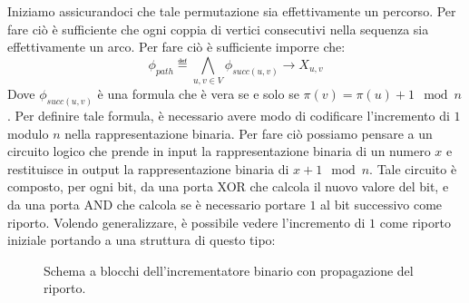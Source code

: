 Iniziamo assicurandoci che tale permutazione sia effettivamente un percorso. Per fare ciò è sufficiente che ogni coppia di vertici consecutivi nella sequenza sia effettivamente un arco. Per fare ciò è sufficiente imporre che:
\[\phi_{path} \eqdef \bigwedge_{u,v\in V} \phi_{succ(u,v)} \to X_{u,v}\]
Dove \(\phi_{succ(u,v)}\) è una formula che è vera se e solo se \(\pi(v) = \pi(u)+1 \mod n\). Per definire tale formula, è necessario avere modo di codificare l'incremento di \(1\) modulo \(n\) nella rappresentazione binaria. Per fare ciò possiamo pensare a un circuito logico che prende in input la rappresentazione binaria di un numero \(x\) e restituisce in output la rappresentazione binaria di \(x+1 \mod n\). Tale circuito è composto, per ogni bit, da una porta XOR che calcola il nuovo valore del bit, e da una porta AND che calcola se è necessario portare \(1\) al bit successivo come riporto. Volendo generalizzare, è possibile vedere l'incremento di \(1\) come riporto iniziale portando a una struttura di questo tipo:

\begin{figure}[h!]
	\centering
	\caption{Schema a blocchi dell'incrementatore binario con propagazione del riporto.}\label{fig:binary-incrementer}
\end{figure}

